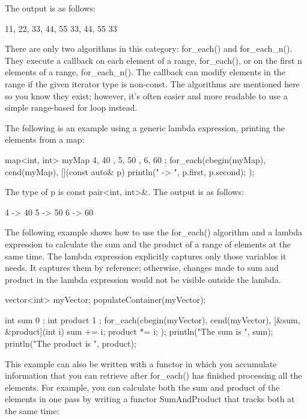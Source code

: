 The output is as follows:

\begin{shell}
11, 22, 33, 44, 55
33, 44, 55
33
\end{shell}


There are only two algorithms in this category: for\_each() and for\_each\_n(). They execute a callback on each element of a range, for\_each(), or on the first n elements of a range, for\_each\_n(). The callback can modify elements in the range if the given iterator type is non-const. The algorithms are mentioned here so you know they exist; however, it’s often easier and more readable to use a simple range-based for loop instead.


The following is an example using a generic lambda expression, printing the elements from a map:

\begin{cpp}
map<int, int> myMap { { 4, 40 }, { 5, 50 }, { 6, 60 } };
for_each(cbegin(myMap), cend(myMap), [](const auto& p)
    { println("{} -> {}", p.first, p.second); });
\end{cpp}

The type of p is const pair<int, int>\&. The output is as follows:

\begin{shell}
4 -> 40
5 -> 50
6 -> 60
\end{shell}

The following example shows how to use the for\_each() algorithm and a lambda expression to calculate the sum and the product of a range of elements at the same time. The lambda expression explicitly captures only those variables it needs. It captures them by reference; otherwise, changes made to sum and product in the lambda expression would not be visible outside the lambda.

\begin{cpp}
vector<int> myVector;
populateContainer(myVector);

int sum { 0 };
int product { 1 };
for_each(cbegin(myVector), cend(myVector),
[&sum, &product](int i){
    sum += i;
    product *= i;
});
println("The sum is {}", sum);
println("The product is {}", product);
\end{cpp}

This example can also be written with a functor in which you accumulate information that you can retrieve after for\_each() has finished processing all the elements. For example, you can calculate both the sum and product of the elements in one pass by writing a functor SumAndProduct that tracks both at the same time:

